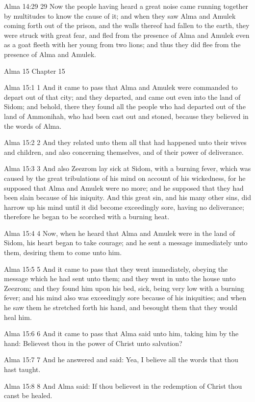 Alma 14:29
 29 Now the people having heard a great noise came running
together by multitudes to know the cause of it; and when they saw
Alma and Amulek coming forth out of the prison, and the walls
thereof had fallen to the earth, they were struck with great
fear, and fled from the presence of Alma and Amulek even as a
goat fleeth with her young from two lions; and thus they did flee
from the presence of Alma and Amulek.

Alma 15
Chapter 15

Alma 15:1
 1 And it came to pass that Alma and Amulek were commanded to
depart out of that city; and they departed, and came out even
into the land of Sidom; and behold, there they found all the
people who had departed out of the land of Ammonihah, who had
been cast out and stoned, because they believed in the words of
Alma.

Alma 15:2
 2 And they related unto them all that had happened unto their
wives and children, and also concerning themselves, and of their
power of deliverance.

Alma 15:3
 3 And also Zeezrom lay sick at Sidom, with a burning fever,
which was caused by the great tribulations of his mind on account
of his wickedness, for he supposed that Alma and Amulek were no
more; and he supposed that they had been slain because of his
iniquity. And this great sin, and his many other sins, did
harrow up his mind until it did become exceedingly sore, having
no deliverance; therefore he began to be scorched with a burning
heat.

Alma 15:4
 4 Now, when he heard that Alma and Amulek were in the land of
Sidom, his heart began to take courage; and he sent a message
immediately unto them, desiring them to come unto him.

Alma 15:5
 5 And it came to pass that they went immediately, obeying the
message which he had sent unto them; and they went in unto the
house unto Zeezrom; and they found him upon his bed, sick, being
very low with a burning fever; and his mind also was exceedingly
sore because of his iniquities; and when he saw them he stretched
forth his hand, and besought them that they would heal him.

Alma 15:6
 6 And it came to pass that Alma said unto him, taking him by the
hand: Believest thou in the power of Christ unto salvation?

Alma 15:7
 7 And he answered and said: Yea, I believe all the words that
thou hast taught.

Alma 15:8
 8 And Alma said: If thou believest in the redemption of Christ
thou canst be healed.

